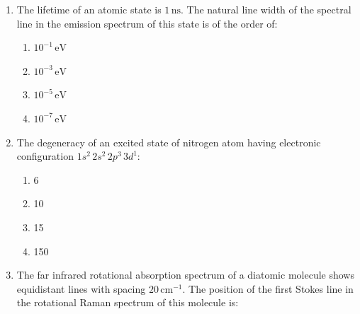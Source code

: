 \documentclass[journal,12pt,onecolumn]{IEEEtran}
\begin{document}
\begin{enumerate}
\hfill{}

\begin{multicols}{4}
\begin{enumerate}
    \item $1, -3$
    \item $0, -3$
    \item $1, 3$
    \item $0, 3$
\end{enumerate}
\end{multicols}

\item The lifetime of an atomic state is $1\,\mathrm{ns}$. The natural line width of the spectral line in the emission spectrum of this state is of the order of:

\hfill{}

\begin{multicols}{4}
\begin{enumerate}
    \item $10^{-1} \,\mathrm{eV}$
    \item $10^{-3} \,\mathrm{eV}$
    \item $10^{-5} \,\mathrm{eV}$
    \item $10^{-7} \,\mathrm{eV}$
\end{enumerate}
\end{multicols}

\item The degeneracy of an excited state of nitrogen atom having electronic configuration $1s^2 \, 2s^2 \, 2p^3 \, 3d^1$:

\hfill{}

\begin{multicols}{4}
\begin{enumerate}
    \item 6
    \item 10
    \item 15
    \item 150
\end{enumerate}
\end{multicols}

\item The far infrared rotational absorption spectrum of a diatomic molecule shows equidistant lines with spacing $20\,\mathrm{cm^{-1}}$. The position of the first Stokes line in the rotational Raman spectrum of this molecule is:

\hfill{}


\end{enumerate}
\end{document}
